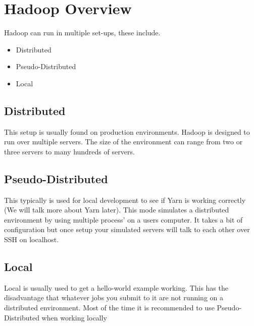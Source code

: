 \section{Hadoop Overview}

Hadoop can run in multiple set-ups, these include. 

\begin{itemize}
\item Distributed
\item Pseudo-Distributed
\item Local
\end{itemize}

\subsection{Distributed}

This setup is usually found on production environments. Hadoop is designed to run over multiple servers. The size of the environment can range from two or three servers to many hundreds of servers. 

\subsection{Pseudo-Distributed}

This typically is used for local development to see if Yarn is working correctly (We will talk more about Yarn later). This mode simulates a distributed environment by using multiple process' on a users computer. It takes a bit of configuration but once setup your simulated servers will talk to each other over SSH on localhost. 

\subsection{Local}

Local is usually used to get a hello-world example working. This has the disadvantage that whatever jobs you submit to it are not running on a distributed environment. Most of the time it is recommended to use Pseudo-Distributed when working locally